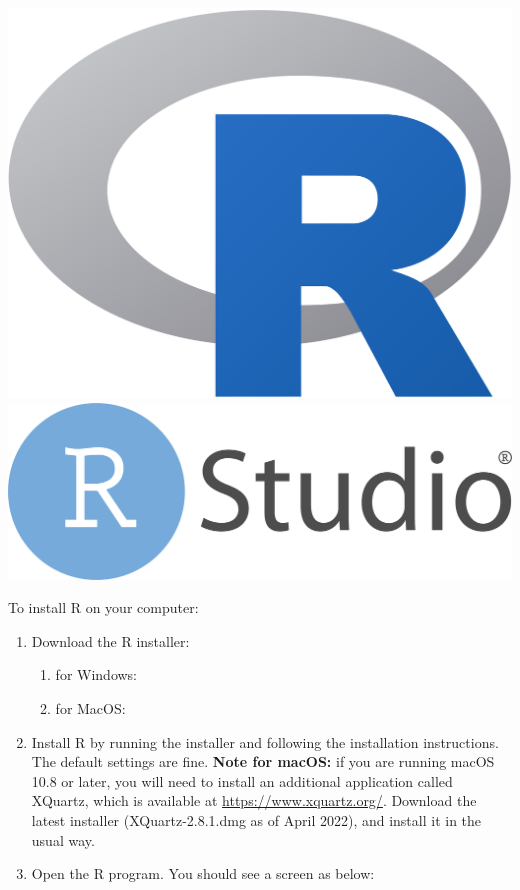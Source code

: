 \documentclass[
]{memoir}
\providecommand{\tightlist}{%
  \setlength{\itemsep}{0pt}\setlength{\parskip}{0pt}}
\begin{document}
\includegraphics[width=0.8\linewidth]{img/Rlogo} \includegraphics[width=0.8\linewidth]{img/RStudio-logo-flat}

To install R on your computer:

\begin{enumerate}
\def\labelenumi{\arabic{enumi}.}
\tightlist
\item
  Download the R installer:

  \begin{enumerate}
  \def\labelenumii{\alph{enumii}.}
  \tightlist
  \item
    for Windows:
  \item
    for MacOS:
  \end{enumerate}
\item
  Install R by running the installer and following the installation instructions. The default settings are fine.
  \textbf{Note for macOS:} if you are running macOS 10.8 or later, you will need to install an additional application called XQuartz, which is available at \url{https://www.xquartz.org/}. Download the latest installer (XQuartz-2.8.1.dmg as of April 2022), and install it in the usual way.
\item
  Open the R program. You should see a screen as below:
\end{enumerate}
\end{document}
